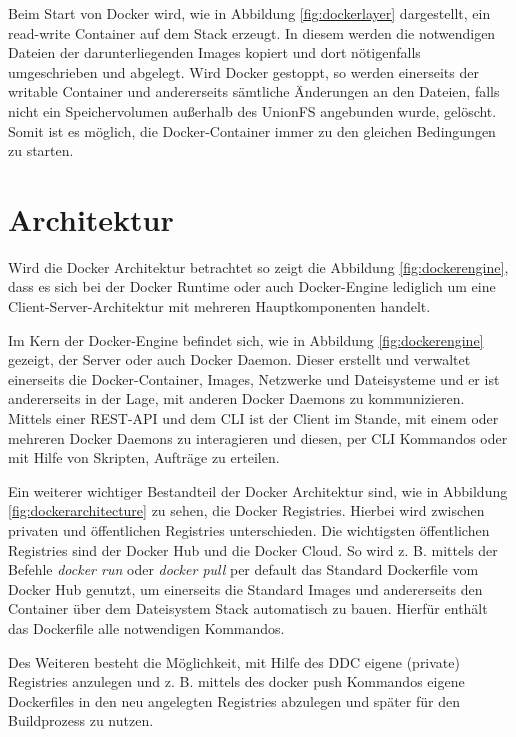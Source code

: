 Beim Start von Docker wird, wie in Abbildung \ref{fig:dockerlayer} dargestellt, ein read-write Container auf dem Stack erzeugt.
In diesem werden die notwendigen Dateien der darunterliegenden Images kopiert und dort nötigenfalls umgeschrieben und abgelegt.
Wird Docker gestoppt, so werden einerseits der writable Container und andererseits sämtliche Änderungen an den Dateien, falls nicht ein Speichervolumen außerhalb des \ac{UnionFS} angebunden wurde, gelöscht.
Somit ist es möglich, die Docker-Container immer zu den gleichen Bedingungen zu starten.

\section{Architektur}
\label{c:architektur}

Wird die Docker Architektur betrachtet so zeigt die Abbildung \ref{fig:dockerengine}, dass es sich bei der Docker Runtime oder auch Docker-Engine lediglich um eine Client-Server-Architektur mit mehreren Hauptkomponenten handelt.

Im Kern der Docker-Engine befindet sich, wie in Abbildung \ref{fig:dockerengine} gezeigt, der Server oder auch Docker Daemon.
Dieser erstellt und verwaltet einerseits die Docker-Container, Images, Netzwerke und Dateisysteme und er ist andererseits in der Lage, mit anderen Docker Daemons zu kommunizieren.
Mittels einer REST-API und dem \ac{CLI} ist der Client im Stande, mit einem oder mehreren Docker Daemons zu interagieren und diesen, per \ac{CLI} Kommandos oder mit Hilfe von Skripten, Aufträge zu erteilen.

Ein weiterer wichtiger Bestandteil der Docker Architektur sind, wie in Abbildung \ref{fig:dockerarchitecture} zu sehen, die Docker Registries.
Hierbei wird zwischen privaten und öffentlichen Registries unterschieden.
Die wichtigsten öffentlichen Registries sind der Docker Hub und die Docker Cloud.
So wird z. B. mittels der Befehle \textit{docker run} oder \textit{docker pull} per default das Standard Dockerfile vom Docker Hub genutzt, um einerseits die Standard Images und andererseits den Container über dem Dateisystem Stack automatisch zu bauen.
Hierfür enthält das Dockerfile alle notwendigen Kommandos.

Des Weiteren besteht die Möglichkeit, mit Hilfe des \ac{DDC} eigene (private) Registries anzulegen und z. B. mittels des docker push Kommandos eigene Dockerfiles in den neu angelegten Registries abzulegen und später für den Buildprozess zu nutzen.

